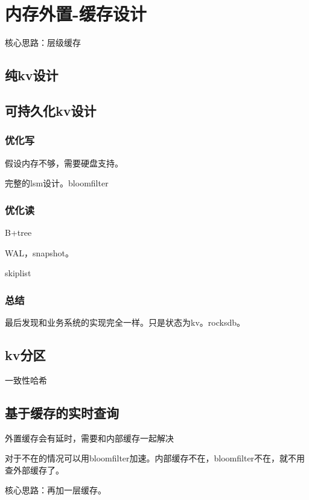 \chapter{内存外置-缓存设计}



核心思路：层级缓存

\section{纯kv设计}
\section{可持久化kv设计}
\subsection{优化写}
假设内存不够，需要硬盘支持。

完整的lsm设计。bloomfilter


\subsection{优化读}
B+tree

WAL，snapshot。

skiplist

\subsection{总结}
最后发现和业务系统的实现完全一样。只是状态为kv。rocksdb。


\section{kv分区}
一致性哈希

\section{基于缓存的实时查询}
外置缓存会有延时，需要和内部缓存一起解决

对于不在的情况可以用bloomfilter加速。内部缓存不在，bloomfilter不在，就不用查外部缓存了。

核心思路：再加一层缓存。